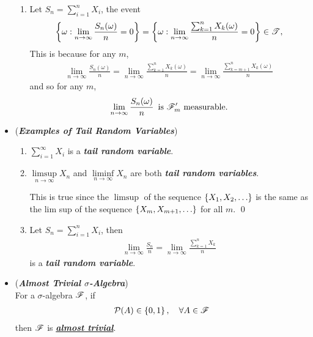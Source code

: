 \documentclass[11pt]{article}
\begin{document}
\begin{itemize}
\begin{example}
\begin{enumerate}
\item Let $S_n = \sum_{i=1}^{n}X_i$, the event 
\begin{align*}
\left\{\omega: \lim\limits_{n\rightarrow \infty}\frac{S_n(\omega)}{n} = 0\right\} = \left\{\omega: \lim\limits_{n\rightarrow \infty}\frac{\sum_{k=1}^{n}X_{k}(\omega)}{n} = 0\right\} \in {\mathscr T},
\end{align*} 
This is because for any $m$,
\begin{align*}
 \lim\limits_{n\rightarrow \infty}\frac{S_n(\omega)}{n} = \lim\limits_{n\rightarrow \infty}\frac{\sum_{k=1}^{n}X_{k}(\omega)}{n} = \lim\limits_{n\rightarrow \infty}\frac{\sum_{k=m+1}^{n}X_{k}(\omega)}{n}
\end{align*} and so for any $m$,
\begin{align*}
\lim\limits_{n\rightarrow \infty}\frac{S_n(\omega)}{n}\, \text{ is ${\mathscr F}_{m}'$ measurable.}
\end{align*}
\end{enumerate}
\end{example}

\item \begin{example}  (\emph{\textbf{Examples of Tail Random Variables}})
\begin{enumerate}
\item $\sum_{i=1}^{\infty}X_i$ is a \emph{\textbf{tail random variable}}.

\item $\limsup\limits_{n\rightarrow \infty} X_{n}$ and $\liminf\limits_{n\rightarrow \infty} X_{n}$ are both \emph{\textbf{tail random variables}}.

This is true since the $\limsup$ of the sequence $\left\{X_1, X_2, \ldots\right\}$ is the same as the lim sup of the sequence $\left\{X_{m}, X_{m+1}, \ldots\right\}$ for all $m$. \qed

\item Let $S_n = \sum_{i=1}^{n}X_i$, then 
\begin{align*}
\lim\limits_{n\rightarrow \infty}\frac{S_n}{n} = \lim\limits_{n\rightarrow \infty}\frac{\sum_{k=1}^{n}X_{k}}{n}
\end{align*} is a \emph{\textbf{tail random variable}}.
\end{enumerate}
\end{example}

\item \begin{definition} (\emph{\textbf{Almost Trivial $\sigma$-Algebra}})\\
For a $\sigma$-algebra ${\mathscr F}$, if 
\begin{align*}
{\mathcal P}(A) \in \left\{0, 1\right\}, \quad \forall A\in {\mathscr F}
\end{align*}
 then ${\mathscr F}$ is \underline{\emph{\textbf{almost trivial}}}. 
\end{definition}


\end{itemize}
\end{document}
